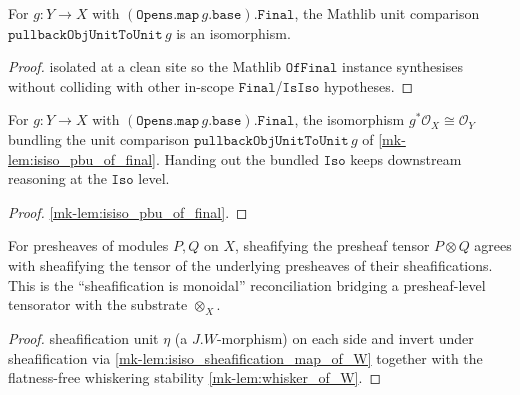 \begin{lemma}\label{mk-lem:isiso_pbu_of_final}
  \leanok

  For \(g : Y \to X\) with \((\mathtt{Opens.map}\,g.\mathtt{base}).\mathtt{Final}\), the
  Mathlib unit comparison \(\mathtt{pullbackObjUnitToUnit}\,g\) is an isomorphism.
\end{lemma}
\begin{proof}
  \leanok
  isolated at a clean site so the Mathlib \(\mathtt{OfFinal}\) instance synthesises
  without colliding with other in-scope \(\mathtt{Final}\)/\(\mathtt{IsIso}\) hypotheses.
\end{proof}

\begin{definition}\label{mk-def:pullback_obj_unit_to_unit_iso}
  \leanok

  For \(g : Y \to X\) with \((\mathtt{Opens.map}\,g.\mathtt{base}).\mathtt{Final}\), the
  isomorphism \(g^*\mathcal{O}_X \cong \mathcal{O}_Y\) bundling the unit comparison
  \(\mathtt{pullbackObjUnitToUnit}\,g\) of \ref{mk-lem:isiso_pbu_of_final}. Handing out the
  bundled \(\mathtt{Iso}\) keeps downstream reasoning at the \(\mathtt{Iso}\) level.
\end{definition}
\begin{proof}
  \leanok
  \ref{mk-lem:isiso_pbu_of_final}.
\end{proof}

\begin{definition}\label{mk-def:sheafify_tensor_unit_iso}
  \leanok

  For presheaves of modules \(P,Q\) on \(X\), sheafifying the presheaf tensor \(P \otimes Q\)
  agrees with sheafifying the tensor of the underlying presheaves of their sheafifications.
  This is the ``sheafification is monoidal'' reconciliation bridging a presheaf-level
  tensorator with the substrate \(\otimes_X\).
\end{definition}
\begin{proof}
  \leanok
  sheafification unit \(\eta\) (a \(J.W\)-morphism) on each side and invert under
  sheafification via \ref{mk-lem:isiso_sheafification_map_of_W} together with the
  flatness-free whiskering stability \ref{mk-lem:whisker_of_W}.
\end{proof}

